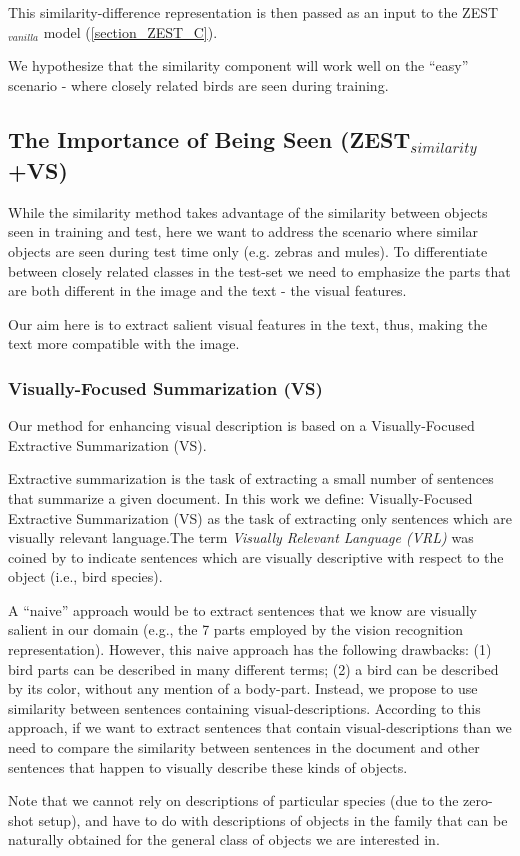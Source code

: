 \documentclass[11pt,a4paper]{article}
\begin{document}
This similarity-difference representation is then passed as an input to the ZEST$_{vanilla}$ model (\ref{section_ZEST_C}). \par

We hypothesize that the similarity component will work well on the \enquote{easy} scenario - where closely related birds are seen during training. \par

\subsection{The Importance of Being Seen (ZEST$_{similarity}$+VS)}

While the similarity method takes advantage of the similarity between objects seen in training and test, here we want to address the scenario where similar objects are seen during test time only (e.g. zebras and mules). To differentiate between closely related classes in the test-set we need to emphasize the parts that are both different in the image and the text - the visual features. \par

Our aim here is to extract salient visual features in the text, thus, making the text more compatible with the image. 

 \par
 
\subsubsection{Visually-Focused Summarization (VS)}


Our method for enhancing visual description is based on a Visually-Focused Extractive Summarization (VS).

Extractive summarization is the task of extracting a small number of sentences that summarize a given document.
In this work we define: Visually-Focused Extractive Summarization (VS) as the task of extracting only sentences which are visually relevant language.The term \textit{Visually Relevant Language (VRL)} was coined by \citet{winn2016detecting} to indicate sentences which are visually descriptive with respect to the object (i.e., bird species).


A \enquote{naive} approach would be to extract sentences that we know are visually salient in our domain (e.g., the 7 parts employed by the vision recognition representation).  However, this naive approach has the following drawbacks: (1) bird parts can be described in many different terms; (2) a bird can be described by its color, without any mention of a body-part. 
Instead, we propose to use similarity between sentences containing visual-descriptions. According to this approach, if we want to extract sentences that contain visual-descriptions than we need to compare the similarity between sentences in the document and other sentences that happen to visually describe these kinds of objects. 
\par
Note that we cannot rely on descriptions of particular species (due to the zero-shot setup), and have to do with descriptions of objects in the family that can be naturally obtained for the general class of objects we are interested in.\par
\end{document}
